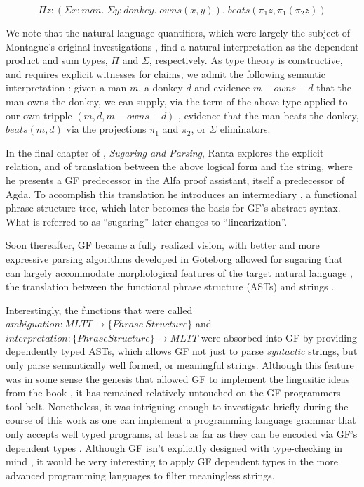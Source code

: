 \[\Pi z : (\Sigma x : man. \; \Sigma y : donkey. \; owns(x,y)). \; beats(\pi_1z,\pi_1(\pi_2z))\]

We note that the natural language quantifiers, which were largely the subject of
Montague's original investigations \cite{Montague1973}, find a natural
interpretation as the dependent product and sum types, $\Pi$ and $\Sigma$,
respectively. As type theory is constructive, and requires explicit witnesses
for claims, we admit the following semantic interpretation : given a man $m$, a
donkey $d$ and evidence $m-owns-d$ that the man owns the donkey, we can supply,
via the term of the above type applied to our own tripple $(m,d,m-owns-d)$ ,
evidence that the man beats the donkey, $beats(m,d)$ via the projections $\pi_1$
and $\pi_2$, or $\Sigma$ eliminators.

In the final chapter of \cite{ranta1994type}, \emph{Sugaring and Parsing}, Ranta
explores the explicit relation, and of translation between the above logical
form and the string, where he presents a GF predecessor in the Alfa proof
assistant, itself a predecessor of Agda. To accomplish this translation he
introduces an intermediary , a functional phrase structure tree, which later
becomes the basis for GF's abstract syntax.  What is referred to as ``sugaring''
later changes to ``linearization''.

Soon thereafter, GF became a fully realized vision, with better and more
expressive parsing algorithms \cite{ljunglof2004expressivity} developed in
Göteborg allowed for sugaring that can largely accommodate morphological
features of the target natural language \cite{rantaForsberg}, the translation
between the functional phrase structure (ASTs) and strings \cite{ranta_2004}.

Interestingly, the functions that were called $ambiguation : MLTT \to \{Phrase\
Structure\}$ and $interpretation : \{Phrase Structure\} \to MLTT$ were absorbed
into GF by providing dependently typed ASTs, which allows GF not just to parse
\emph{syntactic} strings, but only parse semantically well formed, or meaningful
strings. Although this feature was in some sense the genesis that allowed GF to
implement the lingusitic ideas from the book \cite{rantaTT}, it has remained
relatively untouched on the GF programmers tool-belt. Nonetheless, it was
intriguing enough to investigate briefly during the course of this work as one
can implement a programming language grammar that only accepts well typed
programs, at least as far as they can be encoded via GF's dependent types
\cite{warrickHarper}. Although GF isn't explicitly designed with type-checking
in mind , it would be very interesting to apply GF dependent types in the more
advanced programming languages to filter meaningless strings.

